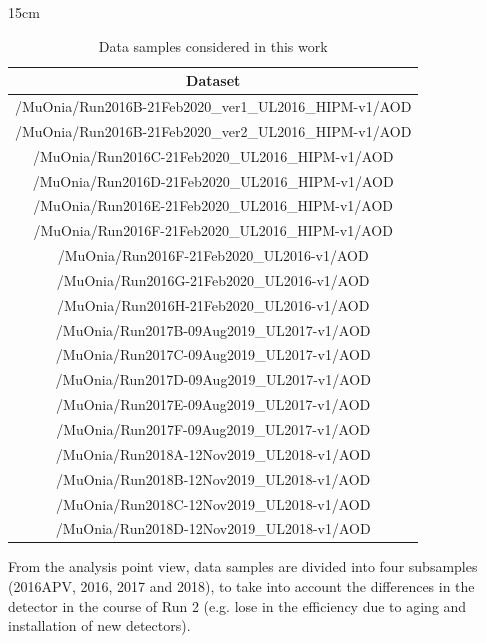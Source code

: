 \begin{table}[!htbp]{15cm}
  \caption{Data samples considered in this work}\label{tab:datasamples}
  \begin{tabular}{ c }
    Dataset                                               \\
    \hline
    /MuOnia/Run2016B-21Feb2020\_ver1\_UL2016\_HIPM-v1/AOD \\
    /MuOnia/Run2016B-21Feb2020\_ver2\_UL2016\_HIPM-v1/AOD \\
    /MuOnia/Run2016C-21Feb2020\_UL2016\_HIPM-v1/AOD       \\
    /MuOnia/Run2016D-21Feb2020\_UL2016\_HIPM-v1/AOD       \\
    /MuOnia/Run2016E-21Feb2020\_UL2016\_HIPM-v1/AOD       \\
    /MuOnia/Run2016F-21Feb2020\_UL2016\_HIPM-v1/AOD       \\
    \hline
    /MuOnia/Run2016F-21Feb2020\_UL2016-v1/AOD             \\
    /MuOnia/Run2016G-21Feb2020\_UL2016-v1/AOD             \\
    /MuOnia/Run2016H-21Feb2020\_UL2016-v1/AOD             \\
    \hline
    /MuOnia/Run2017B-09Aug2019\_UL2017-v1/AOD             \\
    /MuOnia/Run2017C-09Aug2019\_UL2017-v1/AOD             \\
    /MuOnia/Run2017D-09Aug2019\_UL2017-v1/AOD             \\
    /MuOnia/Run2017E-09Aug2019\_UL2017-v1/AOD             \\
    /MuOnia/Run2017F-09Aug2019\_UL2017-v1/AOD             \\
    \hline
    /MuOnia/Run2018A-12Nov2019\_UL2018-v1/AOD             \\
    /MuOnia/Run2018B-12Nov2019\_UL2018-v1/AOD             \\
    /MuOnia/Run2018C-12Nov2019\_UL2018-v1/AOD             \\
    /MuOnia/Run2018D-12Nov2019\_UL2018-v1/AOD             \\
  \end{tabular}
\end{table}

From the analysis point view, data samples are divided into four subsamples (2016APV, 2016, 2017 and 2018), to take into account the differences in the detector in the course of Run 2 (e.g. lose in the efficiency due to aging and installation of new detectors).

